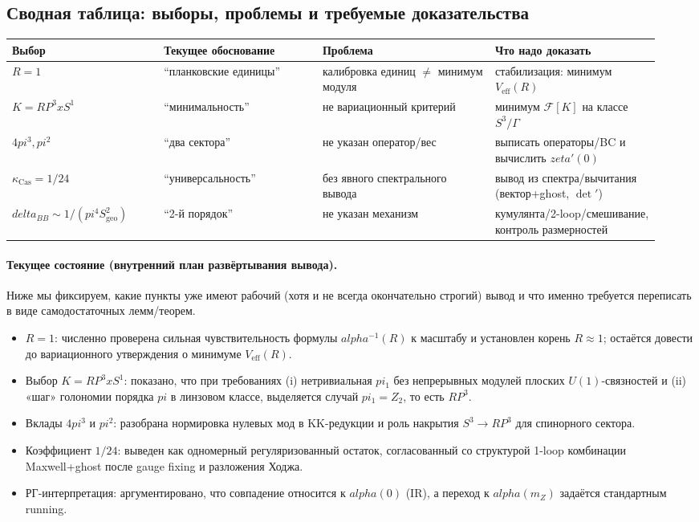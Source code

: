 \documentclass[12pt]{article}
\def\mathbb#1{#1}%
\def\alpha{alpha}%
\def\pi{pi}%
\def\delta{delta}%
\def\times{x}%
\def\zeta{zeta}%
\begin{document}
\subsection{Сводная таблица: выборы, проблемы и требуемые доказательства}
\begin{center}
\renewcommand{\arraystretch}{1.25}
\begin{tabular}{|p{0.22\linewidth}|p{0.23\linewidth}|p{0.25\linewidth}|p{0.24\linewidth}|}
\hline
\textbf{Выбор} & \textbf{Текущее обоснование} & \textbf{Проблема} & \textbf{Что надо доказать} \\
\hline
$R=1$ & ``планковские единицы'' & калибровка единиц $\neq$ минимум модуля & стабилизация: минимум $V_{\mathrm{eff}}(R)$ \\
\hline
$K=\mathbb{RP}^3\times S^1$ & ``минимальность'' & не вариационный критерий & минимум $\mathcal{F}[K]$ на классе $S^3/\Gamma$ \\
\hline
$4\pi^3,\pi^2$ & ``два сектора'' & не указан оператор/вес & выписать операторы/BC и вычислить $\zeta'(0)$ \\
\hline
$\kappa_{\mathrm{Cas}}=1/24$ & ``универсальность'' & без явного спектрального вывода & вывод из спектра/вычитания (вектор+ghost, $\det'$) \\
\hline
$\delta_{BB}\sim 1/(\pi^4 S_{\mathrm{geo}}^2)$ & ``2-й порядок'' & не указан механизм & кумулянта/2-loop/смешивание, контроль размерностей \\
\hline
\end{tabular}
\end{center}

\paragraph{Текущее состояние (внутренний план развёртывания вывода).}
Ниже мы фиксируем, какие пункты уже имеют рабочий (хотя и не всегда окончательно строгий) вывод и что именно требуется переписать в виде самодостаточных лемм/теорем.
\begin{itemize}
  \item $R=1$: численно проверена сильная чувствительность формулы $\alpha^{-1}(R)$ к масштабу и установлен корень $R\approx 1$; остаётся довести до вариационного утверждения о минимуме $V_{\mathrm{eff}}(R)$.
  \item Выбор $K=\mathbb{RP}^3\times S^1$: показано, что при требованиях (i) нетривиальная $\pi_1$ без непрерывных модулей плоских $U(1)$-связностей и (ii) «шаг» голономии порядка $\pi$ в линзовом классе, выделяется случай $\pi_1=\mathbb{Z}_2$, то есть $\mathbb{RP}^3$.
  \item Вклады $4\pi^3$ и $\pi^2$: разобрана нормировка нулевых мод в KK-редукции и роль накрытия $S^3\to\mathbb{RP}^3$ для спинорного сектора.
  \item Коэффициент $1/24$: выведен как одномерный регуляризованный остаток, согласованный со структурой 1-loop комбинации Maxwell+ghost после gauge fixing и разложения Ходжа.
  \item РГ-интерпретация: аргументировано, что совпадение относится к $\alpha(0)$ (IR), а переход к $\alpha(m_Z)$ задаётся стандартным running.
\end{itemize}
\end{document}
